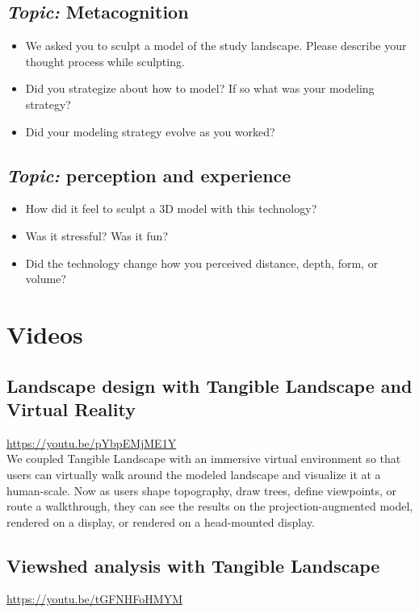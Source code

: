 \documentclass[prodmode,acmtochi]{acmsmall} %
\begin{document}
\subsection{\emph{Topic:} Metacognition}
\begin{itemize}
\item We asked you to sculpt a model of the study landscape. Please describe your thought process while sculpting. 
\item Did you strategize about how to model? If so what was your modeling strategy? 
\item Did your modeling strategy evolve as you worked?
\end{itemize}
\vspace*{0.5em}

\subsection{\emph{Topic:} perception and experience}
\begin{itemize}
\item How did it feel to sculpt a 3D model with this technology?
\item Was it stressful? Was it fun?
\item Did the technology change how you perceived distance, depth, form, or volume?  
\end{itemize}

\vfill

\clearpage

\section{Videos}\label{appendix:videos}

\subsection{Landscape design with Tangible Landscape and Virtual Reality}\label{videos:tl_vr}
\url{https://youtu.be/pYbpEMjME1Y}\\

We coupled Tangible Landscape with an immersive virtual environment so that users can virtually walk around the modeled landscape and visualize it at a human-scale. Now as users shape topography, draw trees, define viewpoints, or route a walkthrough, they can see the results on the projection-augmented model, rendered on a display, or rendered on a head-mounted display.

\subsection{Viewshed analysis with Tangible Landscape}\label{videos:viewshed}
\url{https://youtu.be/tGFNHFoHMYM}
\end{document}
